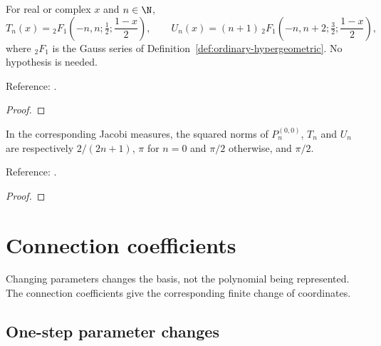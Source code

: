 \begin{supporting}

\begin{theorem}
\label{thm:chebyshev-hypergeometric}
\leanok
For real or complex $x$ and $n\in\N$,
\[T_n(x)={}_2F_1\!\left(-n,n;\tfrac12;\frac{1-x}2\right),\qquad
 U_n(x)=(n+1)\,{}_2F_1\!\left(-n,n+2;\tfrac32;\frac{1-x}2\right),\]
where ${}_2F_1$ is the Gauss series of Definition~\ref{def:ordinary-hypergeometric}. No hypothesis is needed.

Reference: \cite[18.5.11\_2 and 18.5.11\_4]{dlmf}.
\end{theorem}
\begin{proof}
\leanok
\end{proof}

\begin{theorem}
\label{thm:classical-jacobi-norms}
\leanok
In the corresponding Jacobi measures, the squared norms of $P_n^{(0,0)}$, $T_n$
and $U_n$ are respectively $2/(2n+1)$, $\pi$ for $n=0$ and $\pi/2$ otherwise,
and $\pi/2$.

Reference: \cite[Table 18.3.1]{dlmf}.
\end{theorem}
\begin{proof}
\leanok
\end{proof}

\end{supporting}

\chapter{Connection coefficients}\label{chap:connections}


Changing parameters changes the basis, not the polynomial being represented. The connection coefficients give the corresponding finite change of coordinates.

\section{One-step parameter changes}\label{sec:textbook-connections-raising}

